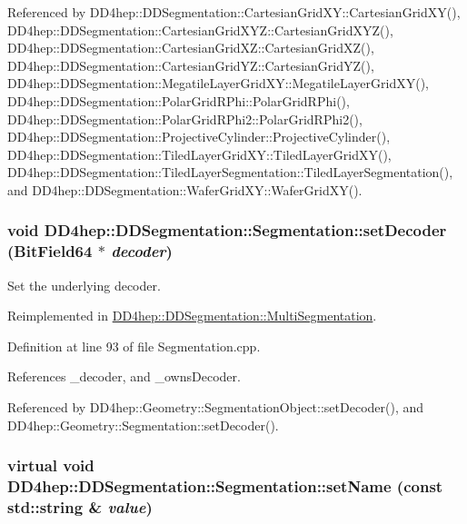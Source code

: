 Referenced by DD4hep::DDSegmentation::CartesianGridXY::CartesianGridXY(), DD4hep::DDSegmentation::CartesianGridXYZ::CartesianGridXYZ(), DD4hep::DDSegmentation::CartesianGridXZ::CartesianGridXZ(), DD4hep::DDSegmentation::CartesianGridYZ::CartesianGridYZ(), DD4hep::DDSegmentation::MegatileLayerGridXY::MegatileLayerGridXY(), DD4hep::DDSegmentation::PolarGridRPhi::PolarGridRPhi(), DD4hep::DDSegmentation::PolarGridRPhi2::PolarGridRPhi2(), DD4hep::DDSegmentation::ProjectiveCylinder::ProjectiveCylinder(), DD4hep::DDSegmentation::TiledLayerGridXY::TiledLayerGridXY(), DD4hep::DDSegmentation::TiledLayerSegmentation::TiledLayerSegmentation(), and DD4hep::DDSegmentation::WaferGridXY::WaferGridXY().\hypertarget{class_d_d4hep_1_1_d_d_segmentation_1_1_segmentation_ab5973bc06538d13b1991f55e40635fa0}{
\subsubsection[{setDecoder}]{\setlength{\rightskip}{0pt plus 5cm}void DD4hep::DDSegmentation::Segmentation::setDecoder ({\bf BitField64} $\ast$ {\em decoder})}}
\label{class_d_d4hep_1_1_d_d_segmentation_1_1_segmentation_ab5973bc06538d13b1991f55e40635fa0}


Set the underlying decoder. 

Reimplemented in \hyperlink{class_d_d4hep_1_1_d_d_segmentation_1_1_multi_segmentation_a21a046717c1aae25d103dddeb2829cb9}{DD4hep::DDSegmentation::MultiSegmentation}.

Definition at line 93 of file Segmentation.cpp.

References \_\-decoder, and \_\-ownsDecoder.

Referenced by DD4hep::Geometry::SegmentationObject::setDecoder(), and DD4hep::Geometry::Segmentation::setDecoder().\hypertarget{class_d_d4hep_1_1_d_d_segmentation_1_1_segmentation_a9bfa16e70ac68d6013c49be45b3438c3}{
\subsubsection[{setName}]{\setlength{\rightskip}{0pt plus 5cm}virtual void DD4hep::DDSegmentation::Segmentation::setName (const std::string \& {\em value})}}
\label{class_d_d4hep_1_1_d_d_segmentation_1_1_segmentation_a9bfa16e70ac68d6013c49be45b3438c3}


